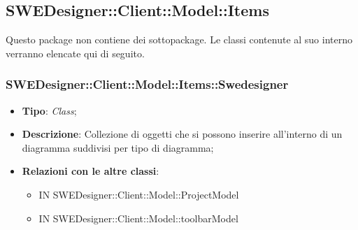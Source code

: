 \documentclass[../DefinizioneDiProdotto.tex]{subfiles}
\begin{document}
			
			\subsection{SWEDesigner::Client::Model::Items}
			\hypertarget{SWEDesigner::Client::Model::Items}{}
			Questo package non contiene dei sottopackage. Le classi contenute al suo interno verranno
			elencate qui di seguito.
			
			\subsubsection{SWEDesigner::Client::Model::Items::Swedesigner}
			\hypertarget{SWEDesigner::Client::Model::Items::Swedesigner}{}
			\begin{itemize}
				\item \textbf{Tipo}: \emph{Class};
				\item \textbf{Descrizione}: Collezione di oggetti che si possono inserire all'interno di un diagramma suddivisi per tipo di diagramma;
				\item \textbf{Relazioni con le altre classi}:
				\begin{itemize}
					\item IN SWEDesigner::Client::Model::ProjectModel
					\item IN SWEDesigner::Client::Model::toolbarModel
				\end{itemize}
			\end{itemize}
			
			
\end{document}
